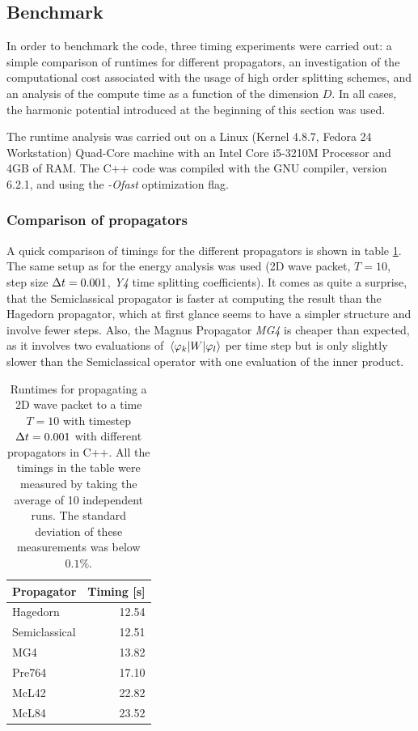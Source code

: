 \subsection{Benchmark}
\label{subsec:benchmark}
%
In order to benchmark the code, three timing experiments were carried out: a simple comparison of runtimes for different propagators, an investigation of the computational cost associated with the usage of high order splitting schemes, and an analysis of the compute time as a function of the dimension $D$.
In all cases, the harmonic potential introduced at the beginning of this section was used.
\par\medskip
%
The runtime analysis was carried out on a Linux (Kernel 4.8.7, Fedora 24 Workstation) Quad-Core machine with an Intel Core i5-3210M Processor and
4GB of RAM. The C++ code was compiled with the GNU compiler, version 6.2.1, and using the \emph{-Ofast} optimization flag.




\subsubsection{Comparison of propagators}
%
A quick comparison of timings for the different propagators is shown in table \ref{tab:speedup}.
The same setup as for the energy analysis was used (2D wave packet, $T = 10$, step size $\Delta t = 0.001$, \emph{Y4} time splitting coefficients).
It comes as quite a surprise, that the Semiclassical propagator is faster at computing the result than the Hagedorn propagator, which at first glance seems to have  a simpler structure and involve fewer steps.
Also, the Magnus Propagator \emph{MG4} is cheaper than expected, as it involves two evaluations of $\matrixel{\varphi_k}{W}{\varphi_l}$ per time step but is only slightly slower than the Semiclassical operator with one evaluation of the inner product.
%
\begin{table}[ht]
	\centering
	\begin{tabular}{|l | r |} 
		\hline
		\multicolumn{1}{|c}{\textbf{Propagator}} &
		\multicolumn{1}{|c|}{\textbf{Timing [s]}} \\
		\hline
		Hagedorn & 12.54 \\
		Semiclassical & 12.51 \\
		MG4 & 13.82 \\
		Pre764 & 17.10 \\
		McL42 & 22.82 \\
		McL84 & 23.52 \\
		\hline
	\end{tabular}
	\caption{Runtimes for propagating a 2D wave packet to a time $T = 10$ with timestep $\Delta t = 0.001$ with different propagators in C++. All the timings in the table were measured by taking the average of 10 independent runs. The standard deviation of these measurements was below $0.1\%$.}
	\label{tab:speedup}
\end{table}



